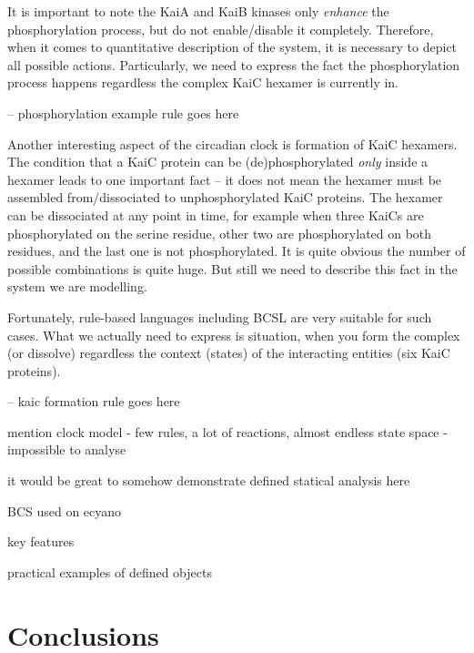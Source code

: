 \documentclass[12pt]{fithesis2}
\begin{document}
It is important to note the KaiA and KaiB kinases only \emph{enhance} the phosphorylation process, but do not enable/disable it completely. Therefore, when it comes to quantitative description of the system, it is necessary to depict all possible actions. Particularly, we need to express the fact the phosphorylation process happens regardless the complex KaiC hexamer is currently in. 

-- phosphorylation example rule goes here

Another interesting aspect of the circadian clock is formation of KaiC hexamers. The condition that a KaiC protein can be (de)phosphorylated \emph{only} inside a hexamer leads to one important fact -- it does not mean the hexamer must be assembled from/dissociated to unphosphorylated KaiC proteins. The hexamer can be dissociated at any point in time, for example when three KaiCs are phosphorylated on the serine residue, other two are phosphorylated on both residues, and the last one is not phosphorylated. It is quite obvious the number of possible combinations is quite huge. But still we need to describe this fact in the system we are modelling.

Fortunately, rule-based languages including BCSL are very suitable for such cases. What we actually need to express is situation, when you form the complex (or dissolve) regardless the context (states) of the interacting entities (six KaiC proteins).

-- kaic formation rule goes here

mention clock model - few rules, a lot of reactions, almost endless state space - impossible to analyse

it would be great to somehow demonstrate defined statical analysis here

BCS used on ecyano

key features
 
practical examples of defined objects

\chapter{Conclusions}

\printbibliography
\end{document}
